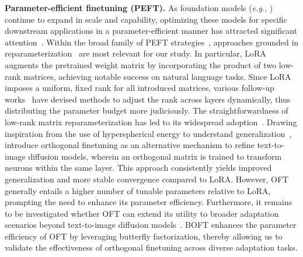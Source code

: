 \textbf{Parameter-efficient finetuning (PEFT).} As foundation models (\emph{e.g.}, \cite{brown2020language,radford2021learning,rombach2022high,kirillov2023segment}) continue to expand in scale and capability, optimizing these models for specific downstream applications in a parameter-efficient manner has attracted significant attention~\cite{treviso2023efficient,ding2023parameter,lialin2023scaling}. Within the broad family of PEFT strategies~\cite{houlsby2019parameter,aghajanyan2020intrinsic,hulora2022,edalati2022krona,wang2022adamix,gheini2021cross,zaken2022bitfit,guo2020parameter,sung2021training,ansell2022composable,lester2021power,li2021prefix,vu2022spot,he2021towards,mao2021unipelt,karimi2021compacter,liu2022few,sung2022lst,chen2022parameter,jia2022visual,chen2022adaptformer,zhang2022neural,jie2023fact,lian2022scaling,luo2023towards}, approaches grounded in reparameterization~\cite{aghajanyan2020intrinsic,hulora2022,edalati2022krona} are most relevant for our study. In particular, LoRA~\cite{hulora2022} augments the pretrained weight matrix by incorporating the product of two low-rank matrices, achieving notable success on natural language tasks. Since LoRA imposes a uniform, fixed rank for all introduced matrices, various follow-up works~\cite{zhang2022adaptive,valipour2022dylora,zhang2023increlora} have devised methods to adjust the rank across layers dynamically, thus distributing the parameter budget more judiciously. The straightforwardness of low-rank matrix reparameterization has led to its widespread adoption~\cite{dettmers2023qlora,zi2023delta,chavan2023one}. Drawing inspiration from the use of hyperspherical energy to understand generalization~\cite{liu2018learning,liu2021orthogonal}, \cite{qiu2023controlling} introduce orthogonal finetuning as an alternative mechanism to refine text-to-image diffusion models, wherein an orthogonal matrix is trained to transform neurons within the same layer. This approach consistently yields improved generalization and more stable convergence compared to LoRA. However, OFT generally entails a higher number of tunable parameters relative to LoRA, prompting the need to enhance its parameter efficiency. Furthermore, it remains to be investigated whether OFT can extend its utility to broader adaptation scenarios beyond text-to-image diffusion models~\cite{qiu2023controlling}. BOFT enhances the parameter efficiency of OFT by leveraging butterfly factorization, thereby allowing us to validate the effectiveness of orthogonal finetuning across diverse adaptation tasks.

